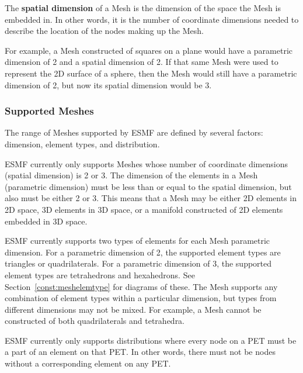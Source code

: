 The {\bf spatial dimension} of a Mesh is the dimension of the space the Mesh is embedded in. In other words, it is the number of coordinate dimensions needed to describe the location of the nodes making up the Mesh. 

For example, a Mesh constructed of squares on a plane would have a parametric dimension of 2 and a spatial dimension of 2. 
If that same Mesh were used to represent the 2D surface of a sphere, then the Mesh would still have a parametric dimension 
of 2, but now its spatial dimension would be 3. 

\subsubsection{Supported Meshes}

The range of Meshes supported by ESMF are defined by several factors: dimension, element 
types, and distribution.

ESMF currently only supports Meshes whose number of coordinate dimensions (spatial dimension) 
is 2 or 3. The dimension of the elements in a Mesh (parametric dimension) must be less than 
or equal to the spatial dimension, but also must be either 2 or 3. This means that a Mesh may 
be either 2D elements in 2D space, 3D elements in 3D space, or a manifold constructed of 2D 
elements embedded in 3D space. 

ESMF currently supports two types of elements for each Mesh parametric dimension. For a 
parametric dimension of 2, the supported element types are triangles or quadrilaterals. For 
a parametric dimension of 3, the supported element types are tetrahedrons
and hexahedrons. See Section~\ref{const:meshelemtype} for diagrams of these. The Mesh 
supports any combination of element types within a particular dimension, but types from 
different dimensions may not be mixed.  For example, a Mesh cannot be constructed of both 
quadrilaterals and tetrahedra.

ESMF currently only supports distributions where every node on a PET must be a part of an 
element on that PET. In other words, there must not be nodes without a corresponding element 
on any PET.
